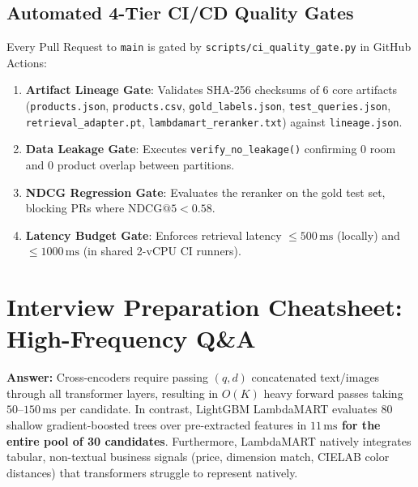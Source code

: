 \documentclass[11pt,a4paper]{article}
\begin{document}
\subsection{Automated 4-Tier CI/CD Quality Gates}
Every Pull Request to \texttt{main} is gated by \texttt{scripts/ci\_quality\_gate.py} in GitHub Actions:
\begin{enumerate}
    \item \textbf{Artifact Lineage Gate}: Validates SHA-256 checksums of 6 core artifacts (\texttt{products.json}, \texttt{products.csv}, \texttt{gold\_labels.json}, \texttt{test\_queries.json}, \texttt{retrieval\_adapter.pt}, \texttt{lambdamart\_reranker.txt}) against \texttt{lineage.json}.
    \item \textbf{Data Leakage Gate}: Executes \texttt{verify\_no\_leakage()} confirming 0 room and 0 product overlap between partitions.
    \item \textbf{NDCG Regression Gate}: Evaluates the reranker on the gold test set, blocking PRs where $\text{NDCG}@5 < 0.58$.
    \item \textbf{Latency Budget Gate}: Enforces retrieval latency $\le 500\,\text{ms}$ (locally) and $\le 1000\,\text{ms}$ (in shared 2-vCPU CI runners).
\end{enumerate}

\section{Interview Preparation Cheatsheet: High-Frequency Q\&A}

\begin{tcolorbox}[colback=BoxBg, colframe=SlateDark, arc=2mm, title=\textbf{Q1: Why choose LambdaMART over a heavy Cross-Encoder Transformer for reranking?}]
\textbf{Answer:} Cross-encoders require passing $(q, d)$ concatenated text/images through all transformer layers, resulting in $O(K)$ heavy forward passes taking $50\text{--}150\,\text{ms}$ per candidate. In contrast, LightGBM LambdaMART evaluates 80 shallow gradient-boosted trees over pre-extracted features in \textbf{$11\,\text{ms}$ for the entire pool of 30 candidates}. Furthermore, LambdaMART natively integrates tabular, non-textual business signals (price, dimension match, CIELAB color distances) that transformers struggle to represent natively.
\end{tcolorbox}
\end{document}
